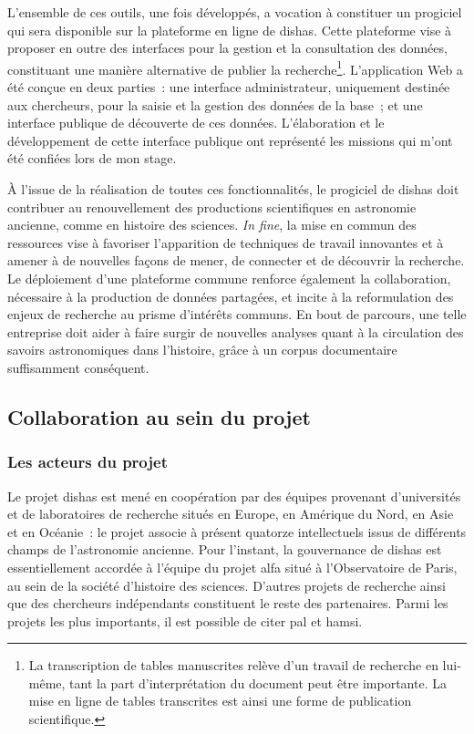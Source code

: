 \documentclass[a4paper,12pt,twoside]{book}
\newcommand{\eng}{\emph}
\newcommand{\dishas}{\gls{dishas}\xspace}
\newcommand{\alfa}{\gls{alfa}\xspace}
\newcommand{\hamsi}{\gls{hamsi}\xspace}
\newcommand{\pal}{\gls{pal}\xspace}
\begin{document}
L'ensemble de ces outils, une fois développés, a vocation à constituer un progiciel qui sera disponible sur la plateforme en ligne de \dishas. Cette plateforme vise à proposer en outre des interfaces pour la gestion et la consultation des données, constituant une manière alternative de publier la recherche\footnote{La transcription de tables manuscrites relève d'un travail de recherche en lui-même, tant la part d'interprétation du document peut être importante. La mise en ligne de tables transcrites est ainsi une forme de publication scientifique.}. L'application Web a été conçue en deux parties~: une interface administrateur, uniquement destinée aux chercheurs, pour la saisie et la gestion des données de la base~; et une interface publique de découverte de ces données. L'élaboration et le développement de cette interface publique ont représenté les missions qui m'ont été confiées lors de mon stage.

À l'issue de la réalisation de toutes ces fonctionnalités, le progiciel de \dishas doit contribuer au renouvellement des productions scientifiques en astronomie ancienne, comme en histoire des sciences. \eng{In fine}, la mise en commun des ressources vise à favoriser l'apparition de techniques de travail innovantes et à amener à de nouvelles façons de mener, de connecter et de découvrir la recherche. Le déploiement d'une plateforme commune renforce également la collaboration, nécessaire à la production de données partagées, et incite à la reformulation des enjeux de recherche au prisme d'intérêts communs. En bout de parcours, une telle entreprise doit aider à faire surgir de nouvelles analyses quant à la circulation des savoirs astronomiques dans l'histoire, grâce à un corpus documentaire suffisamment conséquent.

		\subsection{Collaboration au sein du projet}
			\subsubsection{Les acteurs du projet}
Le projet \dishas est mené en coopération par des équipes provenant d'universités et de laboratoires de recherche situés en Europe, en Amérique du Nord, en Asie et en Océanie~: le projet associe à présent quatorze intellectuels issus de différents champs de l'astronomie ancienne. Pour l'instant, la gouvernance de \dishas est essentiellement accordée à l'équipe du projet \alfa situé à l'Observatoire de Paris, au sein de la société d'histoire des sciences. D'autres projets de recherche ainsi que des chercheurs indépendants constituent le reste des partenaires. Parmi les projets les plus importants, il est possible de citer \pal et \hamsi.
\end{document}
